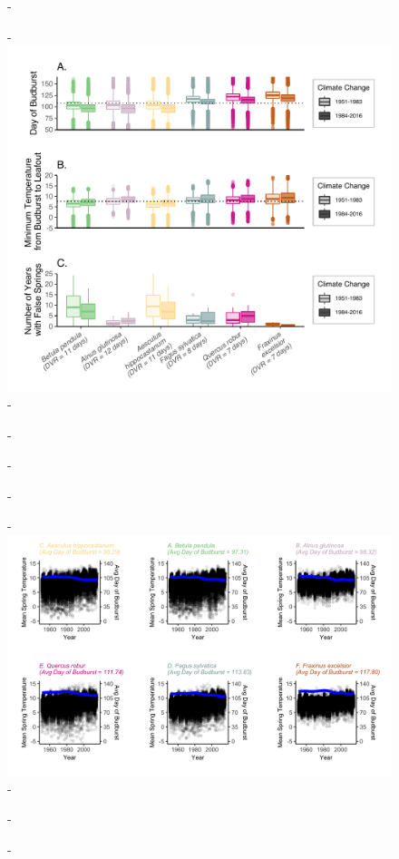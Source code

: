 \documentclass{article}\usepackage[]{graphicx}\usepackage[]{color}
\begin{document}
{\begin{figure} [H]
  -\begin{center}
  -\includegraphics[width=12cm]{..//figures/Boxplot_BBTminFS_dvr.pdf}
  -\caption{}\label{fig:boxfs}
  -\end{center}
  -\end{figure}}
  
{\begin{figure} [H]
  -\begin{center}
  -\includegraphics[width=12cm]{..//figures/MSTBB_bySpp.png}
  -\caption{}\label{fig:mst}
  -\end{center}
  -\end{figure}}
  
\end{document}
